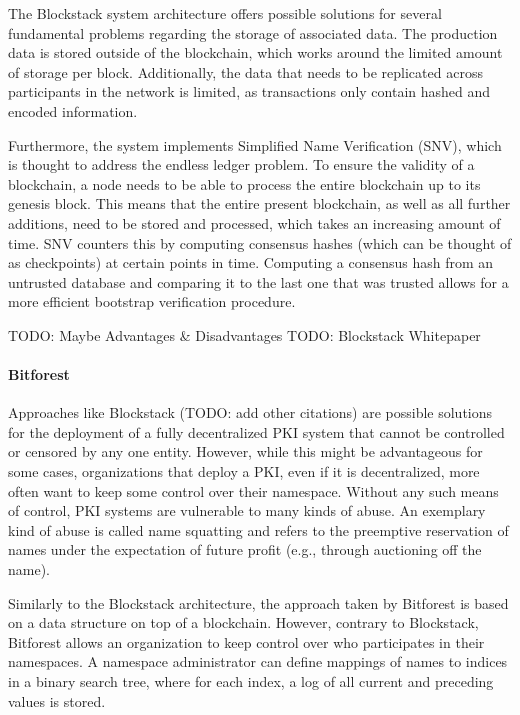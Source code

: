 The Blockstack system architecture offers possible solutions for several fundamental problems regarding the storage of associated data. The production data is stored outside of the blockchain, which works around the limited amount of storage per block. Additionally, the data that needs to be replicated across participants in the network is limited, as transactions only contain hashed and encoded information.

Furthermore, the system implements Simplified Name Verification (SNV), which is thought to address the endless ledger problem. To ensure the validity of a blockchain, a node needs to be able to process the entire blockchain up to its genesis block. This means that the entire present blockchain, as well as all further additions, need to be stored and processed, which takes an increasing amount of time. SNV counters this by computing consensus hashes (which can be thought of as checkpoints) at certain points in time. Computing a consensus hash from an untrusted database and comparing it to the last one that was trusted allows for a more efficient bootstrap verification procedure.

TODO: Maybe Advantages \& Disadvantages
TODO: Blockstack Whitepaper

\paragraph{Bitforest}

Approaches like Blockstack (TODO: add other citations) are possible solutions for the deployment of a fully decentralized PKI system that cannot be controlled or censored by any one entity. However, while this might be advantageous for some cases, organizations that deploy a PKI, even if it is decentralized, more often want to keep some control over their namespace. Without any such means of control, PKI systems are vulnerable to many kinds of abuse. An exemplary kind of abuse is called name squatting and refers to the preemptive reservation of names under the expectation of future profit (e.g., through auctioning off the name).

Similarly to the Blockstack architecture, the approach taken by Bitforest is based on a data structure on top of a blockchain. However, contrary to Blockstack, Bitforest allows an organization to keep control over who participates in their namespaces. A namespace administrator can define mappings of names to indices in a binary search tree, where for each index, a log of all current and preceding values is stored.

